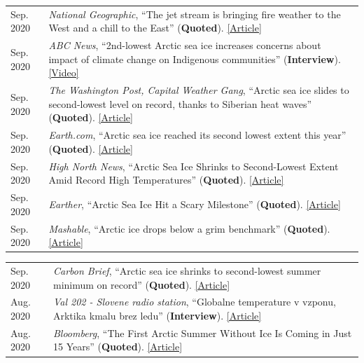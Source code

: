 \documentclass[margin,line,palatino,courier,10pt]{res}
\begin{document}
\begin{resume}
\begin{tabular}{@{}p{0.9in}p{4in}}
Sep. 2020 & \textit{National Geographic}, ``The jet stream is bringing fire weather to the West and a chill to the East'' (\textbf{Quoted}). \href{https://www.nationalgeographic.com/science/2020/09/jet-stream-fire-weather-california-chill-eastern-us/}{[Article]}\\
Sep. 2020 & \textit{ABC News}, ``2nd-lowest Arctic sea ice increases concerns about impact of climate change on Indigenous communities'' (\textbf{Interview}). \href{https://abcnews.go.com/International/2nd-lowest-arctic-sea-ice-increases-concerns-impact/story?id=73224755}{[Video]}\\
Sep. 2020 & \textit{The Washington Post, Capital Weather Gang}, ``Arctic sea ice slides to second-lowest level on record, thanks to Siberian heat waves'' (\textbf{Quoted}). \href{https://www.washingtonpost.com/weather/2020/09/22/arctic-sea-ice-low/}{[Article]}\\
Sep. 2020 & \textit{Earth.com}, ``Arctic sea ice reached its second lowest extent this year'' (\textbf{Quoted}). \href{https://www.earth.com/news/arctic-sea-ice-reached-its-second-lowest-extent-this-year/}{[Article]}\\
Sep. 2020 & \textit{High North News}, ``Arctic Sea Ice Shrinks to Second-Lowest Extent Amid Record High Temperatures'' (\textbf{Quoted}). \href{https://www.highnorthnews.com/en/arctic-sea-ice-shrinks-second-lowest-extent-amid-record-high-temperatures}{[Article]}\\
Sep. 2020 & \textit{Earther}, ``Arctic Sea Ice Hit a Scary Milestone'' (\textbf{Quoted}). \href{https://earther.gizmodo.com/arctic-sea-ice-hit-a-scary-milestone-1845133739}{[Article]}\\
Sep. 2020 & \textit{Mashable}, ``Arctic ice drops below a grim benchmark'' (\textbf{Quoted}). \href{https://mashable.com/article/arctic-sea-ice-decline-2020/}{[Article]}\\
\end{tabular}
\begin{tabular}{@{}p{0.9in}p{4in}}
Sep. 2020 & \textit{Carbon Brief}, ``Arctic sea ice shrinks to second-lowest summer minimum on record'' (\textbf{Quoted}). \href{https://www.carbonbrief.org/arctic-sea-ice-shrinks-to-second-lowest-summer-minimum-on-record}{[Article]}\\
Aug. 2020 & \textit{Val 202 - Slovene radio station}, ``Globalne temperature v vzponu, Arktika kmalu brez ledu'' (\textbf{Interview}). \href{https://val202.rtvslo.si/2020/08/aktualno-20/}{[Article]}\\
Aug. 2020 & \textit{Bloomberg}, ``The First Arctic Summer Without Ice Is Coming in Just 15 Years'' (\textbf{Quoted}). \href{https://www.bloomberg.com/news/articles/2020-08-17/the-first-arctic-summer-without-ice-is-coming-in-just-15-years?srnd=premium}{[Article]}\\

\end{tabular}
\end{resume}
\end{document}
